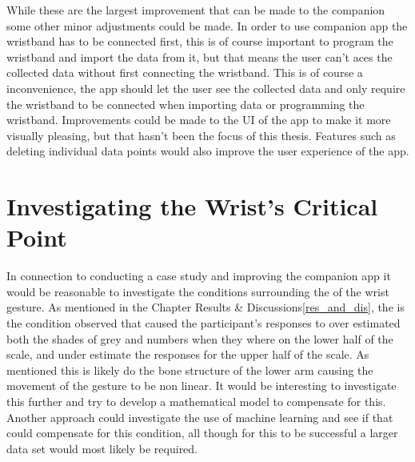 While these are the largest improvement that can be made to the companion some other minor adjustments could be made. In order to use companion app the wristband has to be connected first, this is of course important to program the wristband and import the data from it, but that means the user can't aces the collected data without first connecting the wristband. This is of course a inconvenience, the app should let the user see the collected data and only require the wristband to be connected when importing data or programming the wristband. Improvements could be made to the UI of the app to make it more visually pleasing, but that hasn't been the focus of this thesis. Features such as deleting individual data points would also improve the user experience of the app. 

\section{Investigating the Wrist's Critical Point}
In connection to conducting a case study and improving the companion app it would be reasonable to investigate the conditions surrounding the  of the wrist gesture. As mentioned in the  Chapter Results \& Discussions\ref{res_and_dis}, the  is the condition observed that caused the participant's responses to over estimated both the shades of grey and numbers when they where on the lower half of the scale, and under estimate the responses for the upper half of the scale. As mentioned this is likely do the bone structure of the lower arm causing the movement of the gesture to be non linear. It would be interesting to investigate this further and try to develop a mathematical model to compensate for this. Another approach could investigate the use of machine learning and see if that could compensate for this condition, all though for this to be successful a larger data set would most likely be required.


